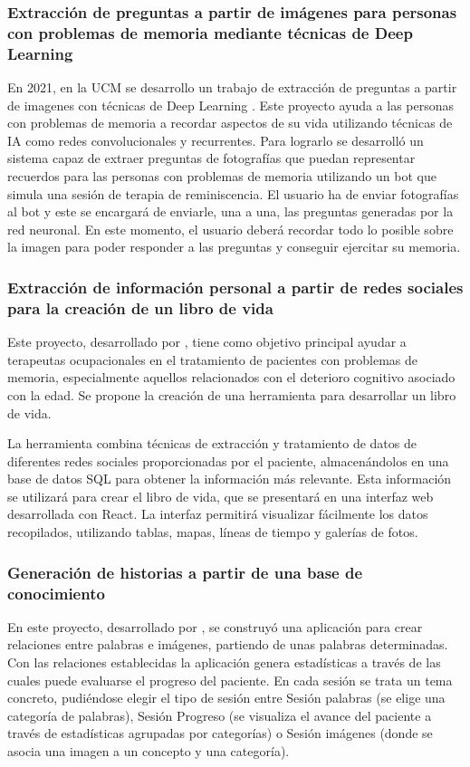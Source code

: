 \subsubsection{Extracción de preguntas a partir de imágenes para personas con problemas de memoria mediante técnicas de Deep Learning}

En 2021, en la UCM se desarrollo un trabajo de extracción de preguntas a partir de imagenes con técnicas de Deep Learning \citep{boto2021extraccion}. Este proyecto ayuda a las personas con problemas de memoria a recordar aspectos de su vida utilizando técnicas de IA como redes convolucionales y recurrentes. Para lograrlo se desarrolló un sistema capaz de extraer preguntas de fotografías que puedan representar recuerdos para las personas con problemas de memoria utilizando un bot que simula una sesión de terapia de reminiscencia.
El usuario ha de enviar fotografías al bot y este se encargará de enviarle, una a una, las preguntas generadas por la red neuronal. En este momento, el usuario deberá recordar todo lo posible sobre la imagen para poder responder a las preguntas y conseguir ejercitar su memoria.

\subsubsection{Extracción de información personal a partir de redes sociales para la creación de un libro de vida}
Este proyecto, desarrollado por \cite{aguilera2021extraccion}, tiene como objetivo principal ayudar a terapeutas ocupacionales en el tratamiento de pacientes con problemas de memoria, especialmente aquellos relacionados con el deterioro cognitivo asociado con la edad. Se propone la creación de una herramienta para desarrollar un libro de vida.

La herramienta combina técnicas de extracción y tratamiento de datos de diferentes redes sociales proporcionadas por el paciente, almacenándolos en una base de datos SQL para obtener la información más relevante. Esta información se utilizará para crear el libro de vida, que se presentará en una interfaz web desarrollada con React. La interfaz permitirá visualizar fácilmente los datos recopilados, utilizando tablas, mapas, líneas de tiempo y galerías de fotos.

\subsubsection{Generación de historias a partir de una base de conocimiento}
En este proyecto, desarrollado por \cite{lucia_latorre_magaz}, se construyó una aplicación para crear relaciones entre palabras e imágenes,
partiendo de unas palabras determinadas. Con las relaciones establecidas la aplicación genera estadísticas a través de las cuales puede evaluarse el progreso del paciente. En cada sesión se trata un tema concreto, pudiéndose elegir el tipo de sesión entre Sesión palabras (se elige una categoría de palabras), Sesión Progreso (se visualiza el avance del paciente a través de estadísticas agrupadas por categorías) o Sesión imágenes (donde se asocia una imagen a un concepto y una categoría).
